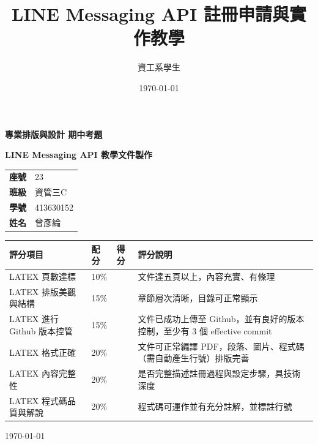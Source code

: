 \documentclass[a4paper,12pt]{report}
\title{LINE Messaging API 註冊申請與實作教學}
\author{資工系學生}
\date{\today}
\begin{document}
\begin{titlepage}
    \centering
    \vspace*{1cm}
    {\fontsize{20}{24}\selectfont\bfseries 專業排版與設計 期中考題\par}
    \vspace{1cm}
    {\fontsize{22}{26}\selectfont\bfseries LINE Messaging API 教學文件製作\par}
    \vspace{1.5cm}

    \begin{tabular}{ll}
        \textbf{座號} & 23 \\
        \textbf{班級} & 資管三C \\
        \textbf{學號} & 413630152 \\
        \textbf{姓名} & 曾彥綸 \\
    \end{tabular}

    \vspace{2cm}
    \renewcommand{\arraystretch}{1.3}
    \begin{tabular}{|p{6.2cm}|p{1.8cm}|p{1.8cm}|p{5.5cm}|}
        \hline
        \textbf{評分項目} & \textbf{配分} & \textbf{得分} & \textbf{評分說明} \\
        \hline
        LATEX 頁數達標 & 10\% &  & 文件達五頁以上，內容充實、有條理 \\
        \hline
        LATEX 排版美觀與結構 & 15\% &  & 章節層次清晰，目錄可正常顯示 \\
        \hline
        LATEX 進行 Github 版本控管 & 15\% &  & 文件已成功上傳至 Github，並有良好的版本控制，至少有 3 個 effective commit \\
        \hline
        LATEX 格式正確 & 20\% &  & 文件可正常編譯 PDF，段落、圖片、程式碼（需自動產生行號）排版完善 \\
        \hline
        LATEX 內容完整性 & 20\% &  & 是否完整描述註冊過程與設定步驟，具技術深度 \\
        \hline
        LATEX 程式碼品質與解說 & 20\% &  & 程式碼可運作並有充分註解，並標註行號 \\
        \hline
    \end{tabular}

    \vfill
    \begin{flushright}
        \small \today
    \end{flushright}
\end{titlepage}

\tableofcontents
\listoffigures
\listoftables
\lstlistoflistings


\end{document}
